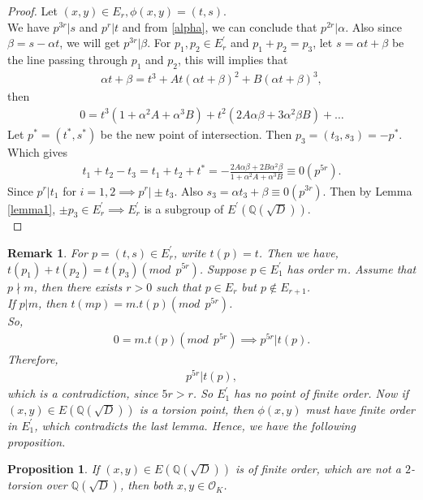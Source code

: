 \documentclass[12pt,leqno]{amsart}
\newcommand{\<}{\langle}
\renewcommand{\>}{\rangle}
\newtheorem{prop}{Proposition}
\newtheorem{rmk}{Remark}
\theoremstyle{definition}
\numberwithin{equation}{section}
\begin{document}
\begin{proof}
    Let $(x,y)\in E_r,\phi(x,y)=(t,s)$.\\
    We have $p^{3r}\vert s$ and $p^r\vert t$ and from \eqref{alpha}, we can conclude that $p^{2r}\vert \alpha$. Also since $\beta=s-\alpha t$, we will get $p^{3r}\vert \beta$. For $p_1,p_2\in E_r^{'}$ and $p_1+p_2=p_3$, let $s=\alpha t+\beta$ be the line passing through $p_1$ and $p_2$, this will implies that
    \begin{align*}
        \alpha t+\beta=t^3+At(\alpha t+\beta)^2+B(\alpha t+\beta)^3,
    \end{align*}
    then
    \begin{align*}
        0=t^3(1+\alpha^2 A+\alpha^3 B)+t^2(2A\alpha \beta+3\alpha^2\beta B)+\ldots
    \end{align*}
    Let $p^*=(t^*,s^*)$ be the new point of intersection. Then $p_3=(t_3,s_3)=-p^*$. Which gives
    \begin{align*}
        t_1+t_2-t_3=t_1+t_2+t^*=-\frac{2A\alpha\beta+2B\alpha^2\beta}{1+\alpha^2A+\alpha^3 B}\equiv 0(p^{5r}).
    \end{align*}
    Since $p^r\vert t_1$ for $i=1,2\implies p^r\vert \pm t_3$. Also $s_3=\alpha t_3+\beta\equiv 0(p^{3r})$. Then by Lemma \ref{lemma1}, $\pm p_3\in E_r^{'}\implies E_r^{'}$ is a subgroup of $E^{'}(\mathbb Q(\sqrt{D}))$.\\
    \end{proof}
    \begin{rmk}
    For $p=(t,s)\in E_r^{'}$, write $t(p)=t$. Then we have, $t(p_1)+t(p_2)=t(p_3)(mod~~p^{5r})$. Suppose $p\in E_1^{'}$ has order $m$.
    Assume that $p\nmid m$, then there exists $r>0$ such that $p\in E_r$ but $p\not\in E_{r+1}$.\\
    If $p\vert m$, then $t(mp)=m.t(p)(mod~~p^{5r})$.\\
    So,\begin{align*}
        0=m.t(p)(mod~~p^{5r})\implies p^{5r}\vert t(p).
    \end{align*}
    Therefore,
    \begin{align*}
        p^{5r}\vert{t(p)},
    \end{align*}
    which is a contradiction, since $5r>r$. So $E_1^{'}$ has no point of finite order. Now if $(x,y)\in E(\mathbb Q(\sqrt{D}))$ is a torsion point, then $\phi(x,y)$ must have finite order in $E_1^{'}$, which contradicts the last lemma. Hence, we have the following proposition.
    \end{rmk}
\begin{prop}\label{proposition}
    If $(x,y)\in E(\mathbb Q(\sqrt{D}))$ is of finite order, which are not a $2$-torsion over $\mathbb{Q}(\sqrt{D})$,  then both $x,y\in{\mathcal{O}_K}$.
\end{prop}
\end{document}

